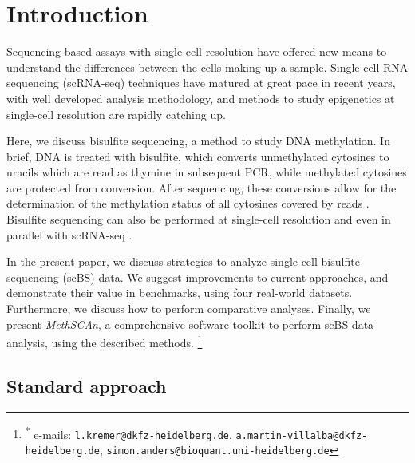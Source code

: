 \documentclass[twocolumn,10pt]{article}
\newcommand\blfootnote[1]{%
    \begingroup
    \renewcommand\thefootnote{}\footnote{#1}%
    \addtocounter{footnote}{-1}%
    \endgroup
}
\newcommand{\new}[1]{#1} %
\begin{document}
\section{Introduction}

Sequencing-based assays with single-cell resolution have offered new means to understand the differences between the cells making up a sample.
Single-cell RNA sequencing (scRNA-seq) techniques have matured at great pace in recent years, with well developed analysis methodology, and methods to study epigenetics at single-cell resolution are rapidly catching up.


Here, we discuss bisulfite sequencing, a method to study DNA methylation.
In brief, DNA is treated with bisulfite, which converts unmethylated cytosines to uracils which are read as thymine in subsequent PCR, while methylated cytosines are protected from conversion.
After sequencing, these conversions allow for the determination of the methylation status of all cytosines covered by reads \citep{Frommer_1992}.
Bisulfite sequencing can also be performed at single-cell resolution \citep{Smallwood_2014} and even in parallel with scRNA-seq \citep{scMTseq,Clark2018}.

In the present paper, we discuss strategies to analyze single-cell bisulfite-sequencing (scBS) data.
We suggest improvements to current approaches, and demonstrate their value in benchmarks, using \new{four} real-world datasets.
Furthermore, we discuss how to perform comparative analyses.
Finally, we present \textit{MethSCAn}, a comprehensive software toolkit to perform scBS data analysis, using the described methods.
\blfootnote{\hspace{-.5cm}\raggedright\textsuperscript{*} e-mails:  \texttt{l.kremer@dkfz-heidelberg.de}, \hspace{1cm}\texttt{a.martin-villalba@dkfz-heidelberg.de}, \hspace{1cm}\texttt{simon.anders@bioquant.uni-heidelberg.de}}


\subsection{Standard approach}
\end{document}

